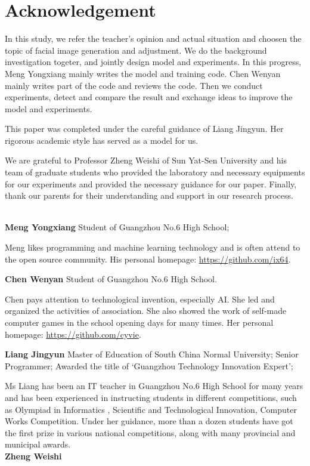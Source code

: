 \section*{Acknowledgement}

In this study, we refer the teacher's opinion and actual situation and choosen the topic of facial image generation and adjustment. We do the background investigation togeter, and jointly design model and experiments. In this progress, Meng Yongxiang mainly writes the model and training code. Chen Wenyan mainly writes part of the code and reviews the code. Then we conduct experiments, detect and compare the result and exchange ideas to improve the model and experiments.

This paper was completed under the careful guidance of Liang Jingyun. Her rigorous academic style has served as a model for us.

We are grateful to Professor Zheng Weishi of Sun Yat-Sen University and his team of graduate students who provided the laboratory and necessary equipments for our experiments and provided the necessary guidance for our paper.
Finally, thank our parents for their understanding and support in our research process.

~\\


\textbf{Meng Yongxiang}  Student of Guangzhou No.6 High School;

Meng likes programming and machine learning technology and is often attend to the open source community. His personal homepage: \url{https://github.com/ix64}.


\textbf{Chen Wenyan}  Student of Guangzhou No.6 High School.

Chen pays attention to technological invention, especially AI. She led and organized the activities of association. She also showed the work of self-made computer games in the school opening days for many times. Her personal homepage: \url{https://github.com/cyvie}.


\textbf{Liang Jingyun}  Master of Education of South China Normal University; Senior Programmer; Awarded the title of ‘Guangzhou Technology Innovation Expert’;

Ms Liang has been an IT teacher in  Guangzhou No.6 High School for many years and has been experienced in instructing students in different competitions, such as Olympiad in Informatics , Scientific and Technological Innovation, Computer Works Competition. Under her guidance, more than a dozen students have got the first prize in various national competitions, along with many provincial and municipal awards.\\


\textbf{Zheng Weishi}

